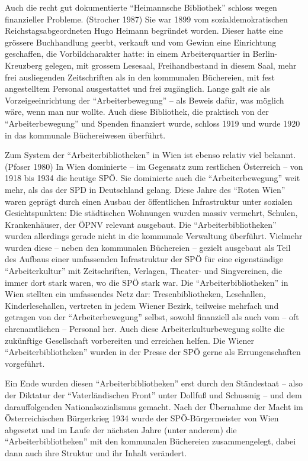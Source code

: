 \documentclass[a4paper,
fontsize=11pt,
oneside,
numbers=noperiodatend,
parskip=half-,
bibliography=totoc,
final
]{scrartcl}
\begin{document}
Auch die recht gut dokumentierte \enquote{Heimannsche Bibliothek}
schloss wegen finanzieller Probleme. (Strocher 1987) Sie war 1899 vom
sozialdemokratischen Reichstagsabgeordneten Hugo Heimann begründet
worden. Dieser hatte eine grössere Buchhandlung geerbt, verkauft und vom
Gewinn eine Einrichtung geschaffen, die Vorbildcharakter hatte: in einem
Arbeiterquartier in Berlin-Kreuzberg gelegen, mit grossem Lesesaal,
Freihandbestand in diesem Saal, mehr frei ausliegenden Zeitschriften als
in den kommunalen Büchereien, mit fest angestelltem Personal
ausgestattet und frei zugänglich. Lange galt sie als Vorzeigeeinrichtung
der \enquote{Arbeiterbewegung} -- als Beweis dafür, was möglich wäre,
wenn man nur wollte. Auch diese Bibliothek, die praktisch von der
\enquote{Arbeiterbewegung} und Spenden finanziert wurde, schloss 1919
und wurde 1920 in das kommunale Büchereiwesen überführt.

Zum System der \enquote{Arbeiterbibliotheken} in Wien ist ebenso relativ
viel bekannt. (Pfoser 1980) In Wien dominierte -- im Gegensatz zum
restlichen Österreich -- von 1918 bis 1934 die heutige SPÖ. Sie
dominierte auch die \enquote{Arbeiterbewegung} weit mehr, als das der
SPD in Deutschland gelang. Diese Jahre des \enquote{Roten Wien} waren
geprägt durch einen Ausbau der öffentlichen Infrastruktur unter sozialen
Gesichtspunkten: Die städtischen Wohnungen wurden massiv vermehrt,
Schulen, Krankenhäuser, der ÖPNV relevant ausgebaut. Die
\enquote{Arbeiterbibliotheken} wurden allerdings gerade nicht in die
kommunale Verwaltung überführt. Vielmehr wurden diese -- neben den
kommunalen Büchereien -- gezielt ausgebaut als Teil des Aufbaus einer
umfassenden Infrastruktur der SPÖ für eine eigenständige
\enquote{Arbeiterkultur} mit Zeitschriften, Verlagen, Theater- und
Singvereinen, die immer dort stark waren, wo die SPÖ stark war. Die
\enquote{Arbeiterbibliotheken} in Wien stellten ein umfassendes Netz
dar: Tresenbibliotheken, Lesehallen, Kinderlesehallen, vertreten in
jedem Wiener Bezirk, teilweise mehrfach und getragen von der
\enquote{Arbeiterbewegung} selbst, sowohl finanziell als auch vom -- oft
ehrenamtlichen -- Personal her. Auch diese Arbeiterkulturbewegung sollte
die zukünftige Gesellschaft vorbereiten und erreichen helfen. Die Wiener
\enquote{Arbeiterbibliotheken} wurden in der Presse der SPÖ gerne als
Errungenschaften vorgeführt.

Ein Ende wurden diesen \enquote{Arbeiterbibliotheken} erst durch den
Ständestaat -- also der Diktatur der \enquote{Vaterländischen Front}
unter Dollfuß und Schussnig -- und dem darauffolgenden
Nationalsozialismus gemacht. Nach der Übernahme der Macht im
Österreichischen Bürgerkrieg 1934 wurde der SPÖ-Bürgermeister von Wien
abgesetzt und im Laufe der nächsten Jahre (unter anderem) die
\enquote{Arbeiterbibliotheken} mit den kommunalen Büchereien
zusammengelegt, dabei dann auch ihre Struktur und ihr Inhalt verändert.
\end{document}

